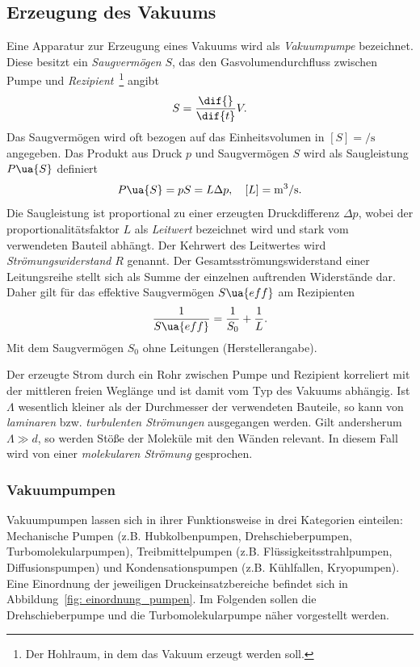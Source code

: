 \subsection{Erzeugung des Vakuums}
Eine Apparatur zur Erzeugung eines Vakuums wird als \emph{Vakuumpumpe} bezeichnet. Diese besitzt ein
\emph{Saugvermögen} $S$, das den Gasvolumendurchfluss zwischen Pumpe und \emph{Rezipient}~\footnote{Der Hohlraum, in dem das Vakuum erzeugt werden soll.}
angibt
\begin{equation}
  S = \frac{\dif{}}{\dif{t}} V.
\end{equation}
Das Saugvermögen wird oft bezogen auf das Einheitsvolumen in $[{S}] = \si{\per \second}$ angegeben.
Das Produkt aus Druck $p$ und Saugvermögen $S$ wird als Saugleistung $P\ua{S}$ definiert
\begin{equation}
  P\ua{S} = p S = L \Delta p , \quad [L] = \si{\meter^3 \per \second}.
\end{equation}
Die Saugleistung ist proportional zu einer erzeugten Druckdifferenz $\Delta p$,
wobei der proportionalitätsfaktor $L$ als \emph{Leitwert} bezeichnet wird und stark vom verwendeten Bauteil abhängt.
Der Kehrwert des Leitwertes wird \emph{Strömungswiderstand} $R$ genannt. Der Gesamtsströmungswiderstand einer Leitungsreihe
stellt sich als Summe der einzelnen auftrenden Widerstände dar. Daher gilt für das effektive Saugvermögen $S\ua{eff}$ am Rezipienten
\begin{equation}
 \frac{1}{S\ua{eff}} = \frac{1}{S_0} + \frac{1}{L}.
 \label{eq: effektives_saugvermögen}
\end{equation}
Mit dem Saugvermögen $S_0$ ohne Leitungen (Herstellerangabe).

Der erzeugte Strom durch ein Rohr zwischen Pumpe und Rezipient korreliert mit der mittleren freien Weglänge
und ist damit vom Typ des Vakuums abhängig. Ist $\Lambda$ wesentlich
kleiner als der Durchmesser der verwendeten Bauteile, so kann von \emph{laminaren} bzw. \emph{turbulenten Strömungen} ausgegangen werden. Gilt andersherum
$\Lambda \gg d$, so werden Stöße der Moleküle mit den Wänden relevant.
In diesem Fall wird von einer \emph{molekularen Strömung} gesprochen.


\subsubsection{Vakuumpumpen}
Vakuumpumpen lassen sich in ihrer Funktionsweise in drei Kategorien einteilen: Mechanische Pumpen (z.B. Hubkolbenpumpen,
Drehschieberpumpen, Turbomolekularpumpen), Treibmittelpumpen (z.B. Flüssigkeitsstrahlpumpen, Diffusionspumpen) und
Kondensationspumpen (z.B. Kühlfallen, Kryopumpen). Eine Einordnung der jeweiligen Druckeinsatzbereiche befindet sich in
Abbildung~\ref{fig: einordnung_pumpen}. Im Folgenden sollen die Drehschieberpumpe und die Turbomolekularpumpe
näher vorgestellt werden.

